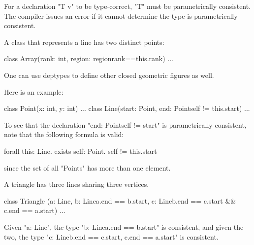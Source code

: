 \begin{staticrule*}
For a declaration \xcd"T v" to be type-correct, \xcd"T" must be parametrically
consistent. The compiler issues an error if it cannot determine
the type is parametrically consistent.
\end{staticrule*}

\begin{example}

A class that represents a line has two distinct points:
\begin{xten}
class Array(rank: int, 
            region: region{rank==this.rank}) {...}  
\end{xten}
\end{example}

One can use deptypes to define other closed geometric figures as well.

\begin{example}
Here is an example:
\begin{xten}
class Point(x: int, y: int) {...}
class Line(start: Point, 
          end: Point{self != this.start}) 
{...}      
\end{xten}
\end{example}


To see that the declaration \xcd"end: Point{self != start}" is
parametrically consistent, note that the following formula is valid:
\begin{xten}
forall this: Line. 
  exists self: Point. self != this.start  
\end{xten}
\noindent since the set of all \xcd"Points" has more than one element.

\begin{example}
A triangle has three lines sharing three vertices.
\begin{xten}
class Triangle 
 (a: Line, 
  b: Line{a.end == b.start}, 
  c: Line{b.end == c.start && c.end == a.start}) 
 { ... }
\end{xten}
\end{example}


Given \xcd"a: Line", the type \xcd"b: Line{a.end == b.start}" is consistent,
and
given the two, the type \xcd"c: Line{b.end == c.start, c.end == a.start}"
is consistent.


